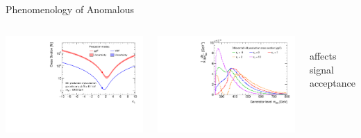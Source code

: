 \documentclass[11pt, xcolor={dvipsnames}, aspectratio=169, notes]{beamer}
\begin{document}
\begin{frame}{Phenomenology of Anomalous \allbold{\klambda}}
  \begin{columns}[t]
    \centering

    \includegraphics[width=\textwidth]{self_coupling/hh_xsec}


    \centering

    \includegraphics[width=\textwidth]{self_coupling/hh_mhh_vs_klam}

    \\
    \ra affects signal acceptance

  \end{columns}
\end{frame}
\end{document}
